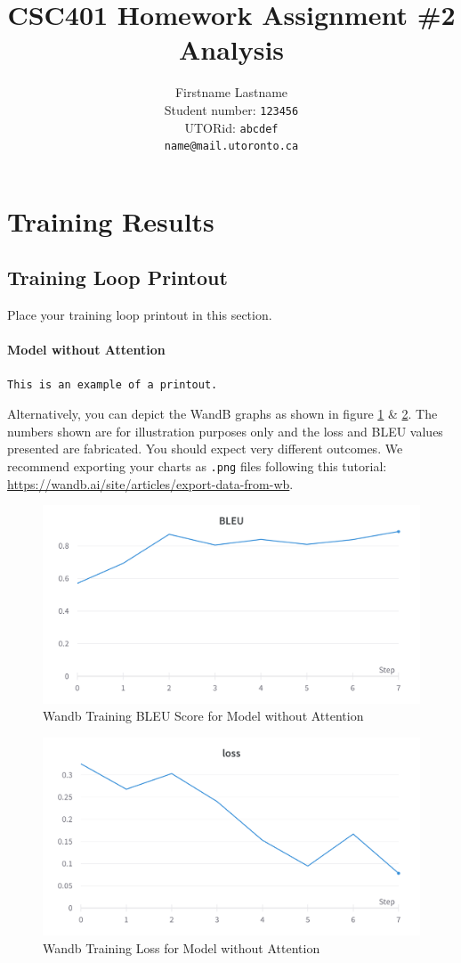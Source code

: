 \documentclass[11pt]{article}
\title{CSC401 Homework Assignment \#2\\Analysis}
\author{Firstname Lastname \\
  Student number: \texttt{123456} \\
  UTORid: \texttt{abcdef} \\
  \texttt{name@mail.utoronto.ca}}
\begin{document}
\maketitle

\section{Training Results}

\subsection{Training Loop Printout}
Place your training loop printout in this section.

\paragraph{Model without Attention}
\begin{verbatim}
This is an example of a printout.
\end{verbatim}

Alternatively, you can depict the WandB graphs as shown in figure \ref{fig:train_bleu_wo_attention} \& \ref{fig:train_loss_wo_attention}. The numbers shown are for illustration purposes only and the loss and BLEU values presented are fabricated. You should expect very different outcomes.  We recommend exporting your charts as {\tt .png} files following this tutorial: \url{https://wandb.ai/site/articles/export-data-from-wb}.

\begin{figure}[hbt!]
\centering
\includegraphics[width=0.65\linewidth]{./wandb_bleu.png}
\caption{Wandb Training BLEU Score for Model without Attention}
\label{fig:train_bleu_wo_attention}
\end{figure}

\begin{figure}[hbt!]
\centering
\includegraphics[width=0.65\linewidth]{./wandb_loss.png}
\caption{Wandb Training Loss for Model without Attention}
\label{fig:train_loss_wo_attention}
\end{figure}
\end{document}
